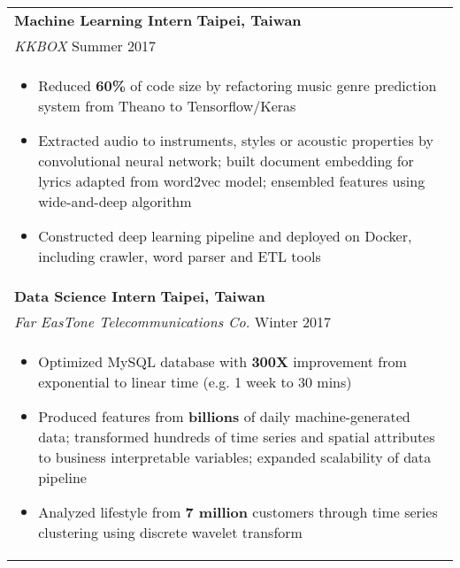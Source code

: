 \documentclass[a4paper,11pt]{article} %
\begin{document}
{\begin{tabular}{p{18.5cm}}
{\bf{Machine Learning Intern}} \hfill \bf{Taipei, Taiwan}\\
{\it KKBOX} \hfill  Summer 2017\\%
\begin{itemize}
\vspace{-3mm}
\item Reduced {\bf 60\%} of code size by refactoring music genre prediction system from Theano to Tensorflow/Keras 
\item Extracted audio to instruments, styles or acoustic properties by convolutional neural network; built document embedding for lyrics adapted from word2vec model; ensembled features using wide-and-deep algorithm 
\item Constructed deep learning pipeline and deployed on Docker, including crawler, word parser and ETL tools  \vspace*{-\baselineskip}
\end{itemize} \\ 
\vspace{.1mm}

{\bf{Data Science Intern}} \hfill \bf{Taipei, Taiwan}\\
{\it Far EasTone Telecommunications Co.} \hfill  Winter 2017\\%
\begin{itemize}
\vspace{-3mm}
\item Optimized MySQL database with {\bf300X} improvement from exponential to linear time (e.g. 1 week to 30 mins) 
\item Produced features from {\bf billions} of daily machine-generated data; transformed hundreds of time series and spatial attributes to business interpretable variables; expanded scalability of data pipeline 
\item Analyzed lifestyle from {\bf7 million} customers through time series clustering using discrete wavelet transform\vspace*{-\baselineskip}
\end{itemize} 
\vspace{.1mm}
\end{tabular}

}
\end{document}
